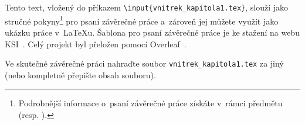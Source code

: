 \small %
Tento text, vložený do  příkazem \texttt{\textbackslash input\{vnitrek\_kapitola1.tex\}}, slouží jako stručné pokyny\footnote{Podrobnější informace o~psaní závěrečné práce získáte v~rámci předmětu  (resp. ).} pro psaní závěrečné práce a~zároveň jej můžete využít jako ukázku práce v~\LaTeX{u}. Šablona pro psaní závěrečné práce je ke stažení na webu KSI~\cite{KSIweb2026}. Celý projekt byl přeložen pomocí Overleaf~\cite{overleaf2026}.
\par 
Ve skutečné závěrečné práci nahraďte soubor \texttt{vnitrek\_kapitola1.tex} za jiný (nebo kompletně přepište obsah souboru).

\newcommand{\prikaz}[1]{\texttt{\textbackslash #1\{\}}} %

 
